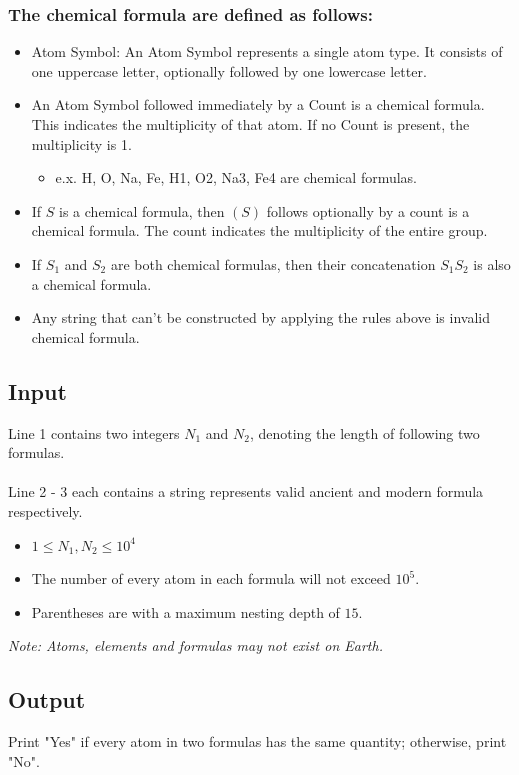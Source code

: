 \documentclass[12pt,a4paper]{article}
\begin{document}
\subsubsection*{The chemical formula are defined as follows:}
\begin{itemize}
    \item Atom Symbol: An Atom Symbol represents a single atom type. It consists of one uppercase letter, optionally followed by one lowercase letter.
    \item An Atom Symbol followed immediately by a Count is a chemical formula. This indicates the multiplicity of that atom. If no Count is present, the multiplicity is 1.
    \begin{itemize}
        \item e.x. H, O, Na, Fe, H1, O2, Na3, Fe4 are chemical formulas.
    \end{itemize}
    \item If $S$ is a chemical formula, then $(S)$ follows optionally by a count is a chemical formula. The count indicates the multiplicity of the entire group.
    \item If $S_1$ and $S_2$ are both chemical formulas, then their concatenation $S_1S_2$ is also a chemical formula.
    \item Any string that can't be constructed by applying the rules above is invalid chemical formula.
\end{itemize}

\subsection*{\fontsize{16}{12}Input}
Line 1 contains two integers $N_1$ and $N_2$, denoting the length of following two formulas.
\\\\
\noindent
Line 2 - 3 each contains a string represents valid ancient and modern formula respectively.
\begin{itemize}
    \item $1 \leq N_1, N_2 \leq 10^4$
    \item The number of every atom in each formula will not exceed \(10^5\).
    \item Parentheses are with a maximum nesting depth of \( 15 \).
\end{itemize}  
\noindent
\textit{Note: Atoms, elements and formulas may not exist on Earth.}  


\subsection*{\fontsize{16}{12}Output}
Print "Yes" if every atom in two formulas has the same quantity; otherwise, print "No".
\end{document}
